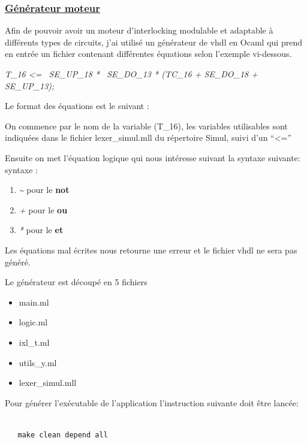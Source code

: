 \subsubsection{\underline{Générateur moteur}}
\label{sec:Générateur}


Afin de pouvoir avoir un moteur d'interlocking modulable et adaptable
à différents types de circuits, j'ai utilisé un générateur de vhdl en
Ocaml qui prend en entrée un fichier contenant  différentes
équations selon l'exemple vi-dessous.

\emph{T\_16 <= ~SE\_UP\_18 * ~SE\_DO\_13 * (TC\_16 + SE\_DO\_18 + SE\_UP\_13);}


Le format des équations est le suivant :


On commence par le nom de la variable (T\_16), les variables utilisables sont
indiquées dans le fichier lexer\_simul.mll du répertoire Simul, suivi
d'un ``<='' 

Ensuite on met l'équation logique qui nous intéresse suivant la syntaxe suivante:
syntaxe :
\begin{enumerate}[->]
    \item \emph{\~} pour le \textbf{not}
    \item \emph{+} pour le \textbf{ou}
    \item \emph{*} pour le \textbf{et}
    \end{enumerate}

\medskip

Les équations mal écrites nous retourne une erreur et le fichier vhdl
ne sera pas généré.

\newpage

Le générateur est découpé en 5 fichiers
\begin{itemize}
   \item main.ml
   \item logic.ml
   \item ixl\_t.ml
   \item utils\_y.ml
   \item lexer\_simul.mll
\end{itemize}  

\medskip

Pour générer l'exécutable de l'application l'instruction suivante doit être lancée:

\begin{lstlisting}

   make clean depend all

\end{lstlisting}
  
